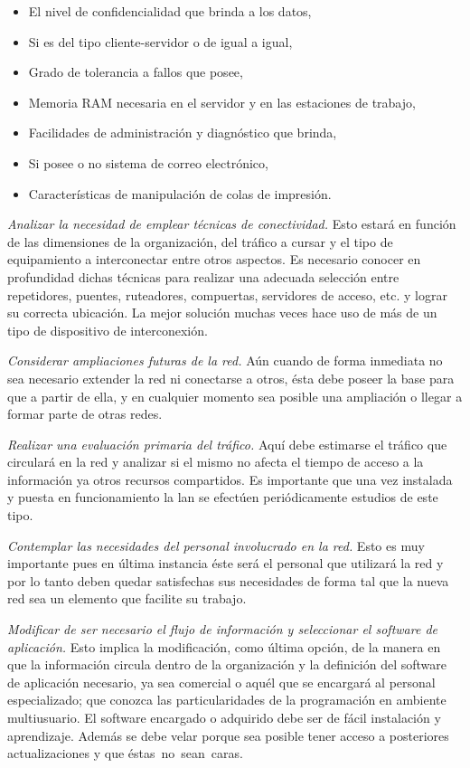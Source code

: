 \begin{itemize}
\item El nivel de confidencialidad que brinda a los datos,
\item Si es del tipo cliente-servidor o de igual a igual,
\item Grado de tolerancia a fallos que posee,
\item Memoria RAM necesaria en el servidor y en las estaciones de trabajo,
\item Facilidades de administración y diagnóstico que brinda,
\item Si posee o no sistema de correo electrónico,
\item Características de manipulación de colas de impresión.
\end{itemize}

\textit{Analizar la necesidad de emplear técnicas de conectividad.} Esto estará en función de las dimensiones de la organización, del tráfico a cursar y el tipo de equipamiento a interconectar entre otros aspectos. Es necesario conocer en profundidad dichas técnicas para realizar una adecuada selección entre repetidores, puentes, ruteadores, compuertas, servidores de acceso, etc. y lograr su correcta ubicación. La mejor solución muchas veces hace uso de más de un tipo de dispositivo de interconexión.

\textit{Considerar ampliaciones futuras de la red.} Aún cuando de forma inmediata no sea necesario extender la red ni conectarse a otros, ésta debe poseer la base para que a partir de ella, y en cualquier momento sea posible una ampliación o llegar a formar parte de otras redes.

\textit{Realizar una evaluación primaria del tráfico.} Aquí debe estimarse el tráfico que circulará en la red y analizar si el mismo no afecta el tiempo de acceso a la información ya otros recursos compartidos. Es importante que una vez instalada y puesta en funcionamiento la \gls{lan} se efectúen periódicamente estudios de este tipo.

\textit{Contemplar las necesidades del personal involucrado en la red.} Esto es muy importante pues en última instancia éste será el personal que utilizará la red y por lo tanto deben quedar satisfechas sus necesidades de forma tal que la nueva red sea un elemento que facilite su trabajo.

\textit{Modificar de ser necesario el flujo de información y seleccionar el software de aplicación.} Esto implica la modificación, como última opción, de la manera en que la información circula dentro de la organización y la definición del software de aplicación necesario, ya sea comercial o aquél que se encargará al personal especializado; que conozca las particularidades de la programación en ambiente multiusuario. El software encargado o adquirido debe ser de fácil instalación y aprendizaje. Además se debe velar porque sea posible tener acceso a posteriores actualizaciones y que éstas no sean caras.


